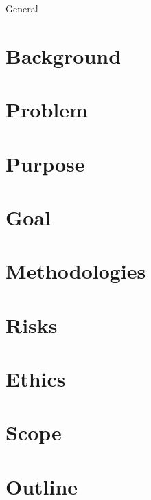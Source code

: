 \documentclass[0-thesis.tex]{subfiles}
\begin{document}
General

\section{Background}

\section{Problem}

\section{Purpose}

\section{Goal}

\section{Methodologies}

\section{Risks}

\section{Ethics}

\section{Scope}

\section{Outline}
\end{document}
